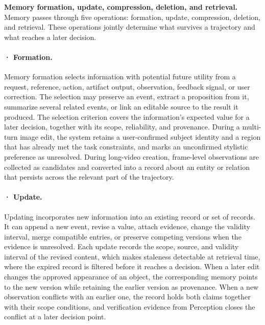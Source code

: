 \textbf{Memory formation, update, compression, deletion, and retrieval.} Memory passes through five operations: formation, update, compression, deletion, and retrieval. These operations jointly determine what survives a trajectory and what reaches a later decision.

\paragraph{· Formation.} Memory formation selects information with potential future utility from a request, reference, action, artifact output, observation, feedback signal, or user correction. The selection may preserve an event, extract a proposition from it, summarize several related events, or link an editable source to the result it produced. The selection criterion covers the information's expected value for a later decision, together with its scope, reliability, and provenance. During a multi-turn image edit, the system retains a user-confirmed subject identity and a region that has already met the task constraints, and marks an unconfirmed stylistic preference as unresolved. During long-video creation, frame-level observations are collected as candidates and converted into a record about an entity or relation that persists across the relevant part of the trajectory.

\paragraph{· Update.} Updating incorporates new information into an existing record or set of records. It can append a new event, revise a value, attach evidence, change the validity interval, merge compatible entries, or preserve competing versions when the evidence is unresolved. Each update records the scope, source, and validity interval of the revised content, which makes staleness detectable at retrieval time, where the expired record is filtered before it reaches a decision. When a later edit changes the approved appearance of an object, the corresponding memory points to the new version while retaining the earlier version as provenance. When a new observation conflicts with an earlier one, the record holds both claims together with their scope conditions, and verification evidence from Perception closes the conflict at a later decision point.


